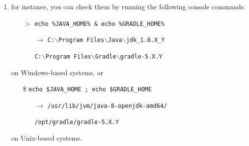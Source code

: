 \documentclass[handout]{beamer}\mode<presentation>{\usetheme{AMSCesenaPurpleAndGold}}
\begin{document}
\begin{frame}[c,allowframebreaks]
\begin{enumerate}
    \vspace{.5cm}
    
    \item for instance, you can check them by running the following console commands:
    \begin{itemize}
        \item[$>$] \texttt{echo \alert{\%}JAVA\_HOME\alert{\%} \& echo \alert{\%}GRADLE\_HOME\alert{\%}}
        \begin{itemize}
            \item[$\rightarrow$] \texttt{C:$\backslash$Program Files$\backslash$Java$\backslash$jdk\_1.8.X\_Y} 
            \item[] \texttt{C:$\backslash$Program Files$\backslash$Gradle$\backslash$gradle-5.X.Y} 
        \end{itemize}
    \end{itemize}
    on Windows-based systems, or
    \begin{itemize}
        \item[\$] \texttt{echo \alert{\$}JAVA\_HOME ; echo \alert{\$}GRADLE\_HOME}
        \begin{itemize}
            \item[$\rightarrow$] \texttt{/usr/lib/jvm/java-8-openjdk-amd64/}
            \item[] \texttt{/opt/gradle/gradle-5.X.Y}
        \end{itemize}
    \end{itemize}
    on Unix-based systems.
    
   \framebreak
    

\end{enumerate}
\end{frame}
\end{document}
